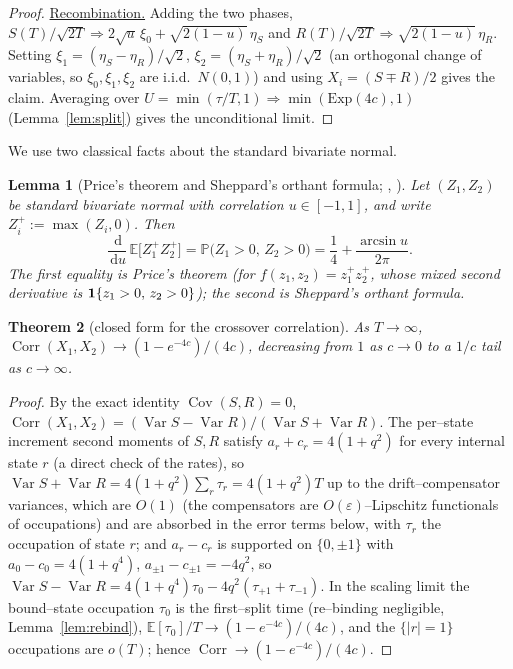 \documentclass[11pt]{article}
\theoremstyle{plain}
\newtheorem{theorem}{Theorem}[section]
\newtheorem{lemma}[theorem]{Lemma}
\theoremstyle{definition}
\theoremstyle{remark}
\DeclareMathOperator{\Var}{Var}\DeclareMathOperator{\Cov}{Cov}
\DeclareMathOperator{\Corr}{Corr}\DeclareMathOperator{\cum}{cum}
\newcommand{\E}{\mathbb{E}}\newcommand{\PP}{\mathbb{P}}\newcommand{\dd}{\,\mathrm{d}}
\newcommand{\To}{\Rightarrow}\newcommand{\so}{\mathfrak{so}}
\newcommand{\eps}{\varepsilon}\newcommand{\Exp}{\mathrm{Exp}}
\begin{document}
\begin{proof}
\underline{Recombination.} Adding the two phases,
$S(T)/\sqrt{2T}\To2\sqrt u\,\xi_0+\sqrt{2(1-u)}\,\eta_S$ and
$R(T)/\sqrt{2T}\To\sqrt{2(1-u)}\,\eta_R$. Setting $\xi_1=(\eta_S-\eta_R)/\sqrt2$,
$\xi_2=(\eta_S+\eta_R)/\sqrt2$ (an orthogonal change of variables, so $\xi_0,\xi_1,\xi_2$
are i.i.d.\ $N(0,1)$) and using $X_i=(S\mp R)/2$ gives the claim. Averaging over
$U=\min(\tau/T,1)\To\min(\Exp(4c),1)$ (Lemma~\ref{lem:split}) gives the unconditional limit.
\end{proof}

We use two classical facts about the standard bivariate normal.

\begin{lemma}[Price's theorem and Sheppard's orthant formula; {\cite{Price}}, {\cite{Sheppard}}]
\label{lem:price}
Let $(Z_1,Z_2)$ be standard bivariate normal with correlation $u\in[-1,1]$, and write
$Z_i^+:=\max(Z_i,0)$. Then
\begin{equation}\label{eq:price}
  \frac{\dd}{\dd u}\,\E\big[Z_1^+Z_2^+\big]=\PP\big(Z_1>0,\,Z_2>0\big)
  =\frac14+\frac{\arcsin u}{2\pi}.
\end{equation}
The first equality is Price's theorem (for $f(z_1,z_2)=z_1^+z_2^+$, whose mixed second
derivative is $\mathbf 1\{z_1>0,\,z_2>0\}$); the second is Sheppard's orthant formula.
\end{lemma}

\begin{theorem}[closed form for the crossover correlation]\label{thm:closed}
As $T\to\infty$, $\Corr(X_1,X_2)\to(1-e^{-4c})/(4c)$, decreasing from $1$ as $c\to0$ to a
$1/c$ tail as $c\to\infty$.
\end{theorem}
\begin{proof}
By the exact identity $\Cov(S,R)=0$,
$\Corr(X_1,X_2)=(\Var S-\Var R)/(\Var S+\Var R)$. The per--state increment second
moments of $S,R$ satisfy $a_r+c_r=4(1+q^2)$ for every internal state $r$ (a direct
check of the rates), so $\Var S+\Var R=4(1+q^2)\sum_r\tau_r=4(1+q^2)T$ up to the
drift--compensator variances, which are $O(1)$ (the compensators are
$O(\eps)$--Lipschitz functionals of occupations) and are absorbed in the error terms
below, with $\tau_r$ the occupation of state $r$; and $a_r-c_r$ is supported on $\{0,\pm1\}$ with
$a_0-c_0=4(1+q^4)$, $a_{\pm1}-c_{\pm1}=-4q^2$, so
$\Var S-\Var R=4(1+q^4)\tau_0-4q^2(\tau_{+1}+\tau_{-1})$. In the scaling limit the
bound--state occupation $\tau_0$ is the first--split time (re--binding negligible,
Lemma~\ref{lem:rebind}), $\E[\tau_0]/T\to(1-e^{-4c})/(4c)$, and the $\{|r|=1\}$
occupations are $o(T)$; hence $\Corr\to(1-e^{-4c})/(4c)$.
\end{proof}
\end{document}
